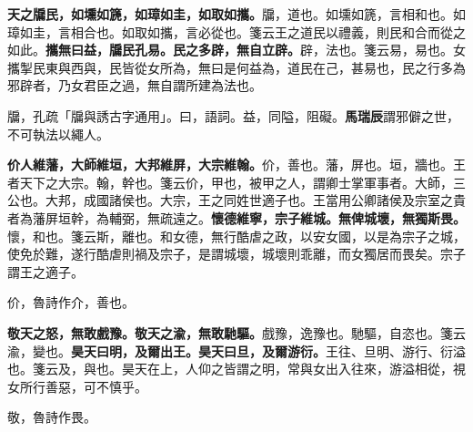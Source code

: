 \textbf{天之牖民，如壎如篪，如璋如圭，如取如攜。}{\footnotesize 牖，道也。如壎如篪，言相和也。如璋如圭，言相合也。如取如攜，言必從也。箋云王之道民以禮義，則民和合而從之如此。}\textbf{攜無曰益，牖民孔易。民之多辟，無自立辟。}{\footnotesize 辟，法也。箋云易，易也。女攜掣民東與西與，民皆從女所為，無曰是何益為，道民在己，甚易也，民之行多為邪辟者，乃女君臣之過，無自謂所建為法也。}

\begin{quoting}牖，孔疏「牖與誘古字通用」。曰，語詞。益，同隘，阻礙。\textbf{馬瑞辰}謂邪僻之世，不可執法以繩人。\end{quoting}

\textbf{价人維藩，大師維垣，大邦維屏，大宗維翰。}{\footnotesize 价，善也。藩，屏也。垣，牆也。王者天下之大宗。翰，幹也。箋云价，甲也，被甲之人，謂卿士掌軍事者。大師，三公也。大邦，成國諸侯也。大宗，王之同姓世適子也。王當用公卿諸侯及宗室之貴者為藩屏垣幹，為輔弼，無疏遠之。}\textbf{懷德維寧，宗子維城。無俾城壞，無獨斯畏。}{\footnotesize 懷，和也。箋云斯，離也。和女德，無行酷虐之政，以安女國，以是為宗子之城，使免於難，遂行酷虐則禍及宗子，是謂城壞，城壞則乖離，而女獨居而畏矣。宗子謂王之適子。}

\begin{quoting}价，魯詩作介，善也。\end{quoting}

\textbf{敬天之怒，無敢戲豫。敬天之渝，無敢馳驅。}{\footnotesize 戲豫，逸豫也。馳驅，自恣也。箋云渝，變也。}\textbf{昊天曰明，及爾出王。昊天曰旦，及爾游衍。}{\footnotesize 王往、旦明、游行、衍溢也。箋云及，與也。昊天在上，人仰之皆謂之明，常與女出入往來，游溢相從，視女所行善惡，可不慎乎。}

\begin{quoting}敬，魯詩作畏。\end{quoting}

